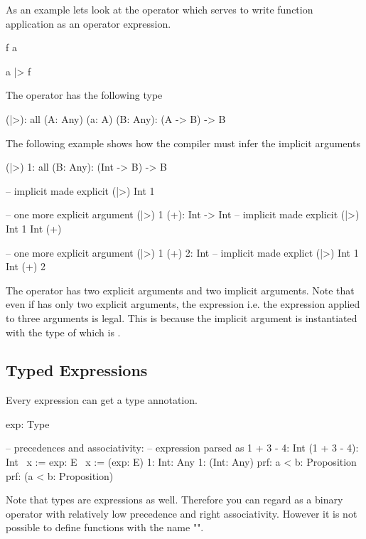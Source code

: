 As an example lets look at the operator \code{|>} which serves to write function
application as an operator expression.
\begin{alba}
    f a

    a |> f
\end{alba}
The \code{|>} operator has the following type
\begin{alba}
    (|>): all (A: Any) (a: A) (B: Any): (A -> B) -> B
\end{alba}
%
The following example shows how the compiler must infer the implicit arguments
%
\begin{alba}
    (|>) 1: all (B: Any): (Int -> B) -> B

    -- implicit made explicit
    (|>) Int 1

    -- one more explicit argument
    (|>) 1 (+): Int -> Int
    -- implicit made explicit
    (|>) Int 1 Int (+)

    -- one more explicit argument
    (|>) 1 (+) 2: Int
    -- implicit made explict
    (|>) Int 1 Int (+) 2
\end{alba}

The operator \code{|>} has two explicit arguments and two implicit arguments.
Note that even if \code{|>} has only two explicit arguments, the expression
 i.e. the expression \code{(|>)} applied to three arguments
is legal. This is because the implicit argument  is instantiated with
the type of \code{(+)} which is .






\vskip 5mm
\subsection{Typed Expressions}

Every expression can get a type annotation.
\begin{alba}
    exp: Type

    -- precedences and associativity:
    -- expression                       parsed as
    1 + 3 - 4: Int                      (1 + 3 - 4): Int
    \ x := exp: E                       \ x := (exp: E)
    1: Int: Any                         1: (Int: Any)
    prf: a < b: Proposition             prf: (a < b: Proposition)
\end{alba}
%
Note that types are expressions as well. Therefore you can regard \code{:} as a
binary operator with relatively low precedence and right associativity. However
it is not possible to define functions with the name "\code{:}".






